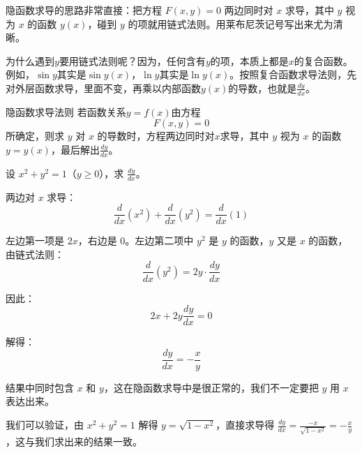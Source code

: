 隐函数求导的思路非常直接：把方程 $F(x,y)=0$ 两边同时对 $x$ 求导，其中 $y$ 视为 $x$ 的函数 $y(x)$，碰到 $y$ 的项就用链式法则。用莱布尼茨记号写出来尤为清晰。

为什么遇到$y$要用链式法则呢？因为，任何含有$y$的项，本质上都是$x$的复合函数。例如，$\sin y$其实是$\sin y(x)$，$\ln y$其实是$\ln y(x)$。按照复合函数求导法则，先对外层函数求导，里面不变，再乘以内部函数$y(x)$的导数，也就是$\frac{dy}{dx}$。

\begin{theorem}{隐函数求导法则}{}
  若函数关系$y = f(x)$由方程
  \[
  F(x, y) = 0
  \]
  所确定，则求 $y$ 对 $x$ 的导数时，方程两边同时对$x$求导，其中 $y$ 视为 $x$ 的函数 $y=y(x)$，最后解出$\frac{dy}{dx}$。
\end{theorem}

\begin{myexample}
  设 $x^2 + y^2 = 1$（$y \geq 0$），求 $\frac{dy}{dx}$。

  两边对 $x$ 求导：
  \[
  \frac{d}{dx}(x^2) + \frac{d}{dx}(y^2) = \frac{d}{dx}(1)
  \]

  左边第一项是 $2x$，右边是 $0$。左边第二项中 $y^2$ 是 $y$ 的函数，$y$ 又是 $x$ 的函数，由链式法则：
  \[
  \frac{d}{dx}(y^2) = 2y \cdot \frac{dy}{dx}
  \]
  
  因此：
  \[
  2x + 2y \frac{dy}{dx} = 0
  \]

  解得：
  \[
  \frac{dy}{dx} = -\frac{x}{y}
  \]

\end{myexample}

结果中同时包含 $x$ 和 $y$，这在隐函数求导中是很正常的，我们不一定要把 $y$ 用 $x$ 表达出来。

  我们可以验证，由 $x^2+y^2=1$ 解得 $y = \sqrt{1-x^2}$，直接求导得 $\frac{dy}{dx} = \frac{-x}{\sqrt{1-x^2}} = -\frac{x}{y}$，这与我们求出来的结果一致。

